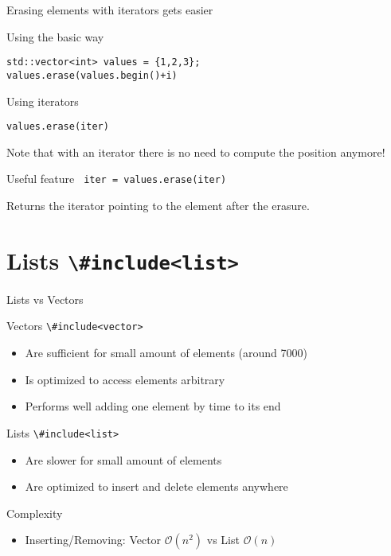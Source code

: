 \documentclass[12pt,t]{beamer}
\begin{document}
\begin{frame}[fragile]{Erasing elements with iterators gets easier }

\begin{block}{Using the basic way }
\begin{lstlisting}
std::vector<int> values = {1,2,3};
values.erase(values.begin()+i)
\end{lstlisting}
\end{block}

\begin{block}{Using iterators}
\begin{lstlisting}
values.erase(iter)
\end{lstlisting}
\end{block}
Note that with an iterator there is no need to compute the position anymore!

\begin{block}{Useful feature}
\lstinline| iter = values.erase(iter)|
\end{block}
Returns the iterator pointing to the element after the erasure.
\end{frame}


\section{Lists \lstinline|\#include<list>|}

\begin{frame}{Lists vs Vectors}

\begin{block}{Vectors \lstinline|\#include<vector>|}
\begin{itemize}
\item Are sufficient for small amount of elements (around 7000)
\item Is optimized to access elements arbitrary
\item Performs well adding one element by time to its end
\end{itemize}
\end{block}

\begin{block}{Lists \lstinline|\#include<list>|  }
\begin{itemize}
\item Are slower for small amount of elements
\item Are optimized to insert and delete elements anywhere
\end{itemize}
\end{block}
\begin{block}{Complexity}
\begin{itemize}
\item Inserting/Removing: Vector $\mathcal{O}(n^2)$ vs List $\mathcal{O}(n)$~\cite{Wirth:1978:ADS:540029,knuth1997art}
\end{itemize}
\end{block}
\end{frame}
\end{document}
